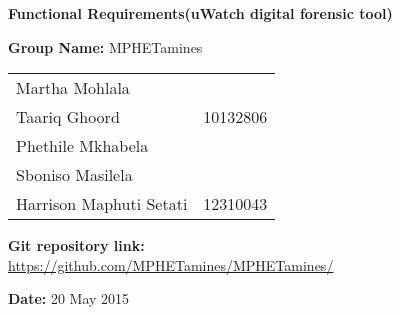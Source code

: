 \documentclass[a4paper,12pt]{article}
\begin{document}
\begin{center}

\Huge\textbf{Functional Requirements(uWatch digital forensic tool)\\}
																											
\vspace{2 cm}

\LARGE\textbf{Group Name:} MPHETamines\newline
 
 
 
 
 
\vspace{0.5 cm}
\begin{tabular}{lr}
Martha Mohlala &%
\\ 
Taariq Ghoord&10132806\\
Phethile Mkhabela&%
\\
Sboniso Masilela&%
\\
Harrison Maphuti Setati&12310043\\
\end{tabular}

\vspace{1cm}
\textbf{Git repository link:\\}
\url{https://github.com/MPHETamines/MPHETamines/}

\vspace{1cm}
\textbf{Date:} 20 May 2015
\end{center}
\newpage

\tableofcontents
{}
\end{document}
